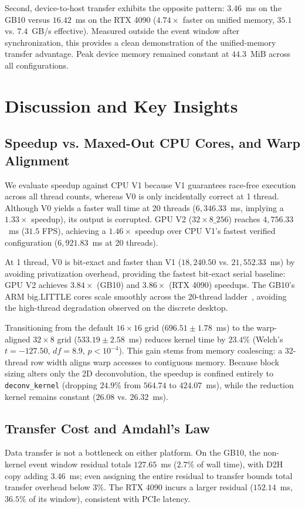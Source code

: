 \documentclass[conference]{IEEEtran}
\begin{document}
Second, device-to-host transfer exhibits the opposite pattern: $3.46$~ms on the GB10 versus $16.42$~ms on the RTX 4090 ($4.74\times$ faster on unified memory, $35.1$ vs. $7.4$~GB/s effective). Measured outside the event window after synchronization, this provides a clean demonstration of the unified-memory transfer advantage. Peak device memory remained constant at $44.3$~MiB across all configurations.

\section{Discussion and Key Insights}

\subsection{Speedup vs. Maxed-Out CPU Cores, and Warp Alignment}
\label{sec:gb10-speedup}
We evaluate speedup against CPU V1 because V1 guarantees race-free execution across all thread counts, whereas V0 is only incidentally correct at 1 thread. Although V0 yields a faster wall time at 20 threads ($6{,}346.33$~ms, implying a $1.33\times$ speedup), its output is corrupted. GPU V2 ($32{\times}8\_256$) reaches $4{,}756.33$~ms ($31.5$ FPS), achieving a $1.46\times$ speedup over CPU V1's fastest verified configuration ($6{,}921.83$~ms at 20 threads).

At 1 thread, V0 is bit-exact and faster than V1 ($18{,}240.50$ vs. $21{,}552.33$~ms) by avoiding privatization overhead, providing the fastest bit-exact serial baseline: GPU V2 achieves $3.84\times$ (GB10) and $3.86\times$ (RTX 4090) speedups. The GB10's ARM big.LITTLE cores scale smoothly across the 20-thread ladder~\cite{wang2020pipeit}, avoiding the high-thread degradation observed on the discrete desktop.

Transitioning from the default $16{\times}16$ grid ($696.51 \pm 1.78$~ms) to the warp-aligned $32{\times}8$ grid ($533.19 \pm 2.58$~ms) reduces kernel time by $23.4\%$ (Welch's $t = -127.50$, $df = 8.9$, $p < 10^{-4}$). This gain stems from memory coalescing: a 32-thread row width aligns warp accesses to contiguous memory. Because block sizing alters only the 2D deconvolution, the speedup is confined entirely to \texttt{deconv\_kernel} (dropping $24.9\%$ from $564.74$ to $424.07$~ms), while the reduction kernel remains constant ($26.08$ vs. $26.32$~ms).

\subsection{Transfer Cost and Amdahl's Law}
\label{sec:nvlink}
Data transfer is not a bottleneck on either platform. On the GB10, the non-kernel event window residual totals $127.65$~ms ($2.7\%$ of wall time), with D2H copy adding $3.46$~ms; even assigning the entire residual to transfer bounds total transfer overhead below $3\%$. The RTX 4090 incurs a larger residual ($152.14$~ms, $36.5\%$ of its window), consistent with PCIe latency.
\end{document}

